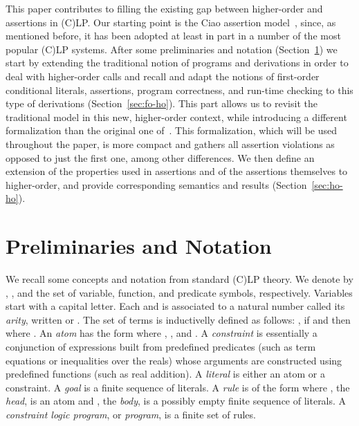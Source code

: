\documentclass{llncs}
\begin{document}
This paper contributes to filling the existing gap between
higher-order and assertions in (C)LP.
Our starting point is the Ciao assertion
model~\cite{assrt-theoret-framework-lopstr99,ciaopp-sas03-journal-scp-short}, since, as mentioned before, it has
been adopted at least in part in a number of the most popular (C)LP
systems.
After some preliminaries and notation (Section~\ref{sec:Prel-Notat})
we start by extending the traditional notion of programs and
derivations in order to deal with higher-order calls and recall and
adapt the notions of first-order conditional literals, assertions,
program correctness, and run-time checking to this type of
derivations (Section~\ref{sec:fo-ho}). This part allows us to revisit
the traditional model in this new, higher-order context, while
introducing a different formalization than the original one
of~\cite{assrt-theoret-framework-lopstr99}. This formalization, which
will be used throughout the paper, is more compact and gathers all
assertion violations as opposed to just the first one, among other
differences.
We then define an extension of the properties used in assertions and
of the assertions themselves to higher-order, and provide
corresponding semantics and results (Section~\ref{sec:ho-ho}).




\section{Preliminaries and Notation}
\label{sec:Prel-Notat}

We recall some concepts and notation from standard (C)LP theory.
We denote by , , and  the set of variable, function,
and predicate symbols, respectively. Variables start with a capital
letter. Each  and  is associated to a natural
number called its \emph{arity}, written  or .
The set of terms  is inductivelly defined as follows: 
, if  and 
then  where .
An \emph{atom} has the form  where 
, , and . 
A \emph{constraint} is essentially a conjunction of expressions built
from predefined predicates (such as term equations or inequalities
over the reals) whose arguments are constructed using predefined
functions (such as real addition).
A \emph{literal} is either an atom or a constraint. 
A \emph{goal} is a finite sequence of literals.
A \emph{rule} is of the form  where , the
\emph{head}, is an atom and , the \emph{body}, is a possibly empty
finite sequence of literals.
A \emph{constraint logic program}, or \emph{program}, is a finite set
of rules.
\end{document}
